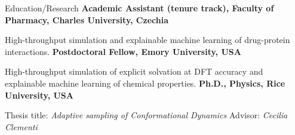 \begin{rubric}{Education/Research}
%
  \textbf{Academic Assistant (tenure track), Faculty of Pharmacy, Charles University, Czechia}
  \par High-throughput simulation and explainable machine learning of drug-protein interactions.
\entry*[2020 -- 2022]%
  \textbf{Postdoctoral Fellow, Emory University, USA}
  \par High-throughput simulation of explicit solvation at DFT accuracy and explainable machine learning of chemical properties. 
\entry*[2014 -- 2020]%
  \textbf{Ph.D., Physics, Rice University, USA}
  \par Thesis title: \emph{Adaptive sampling of Conformational Dynamics} Advisor: \emph{Cecilia Clementi}
\end{rubric}

